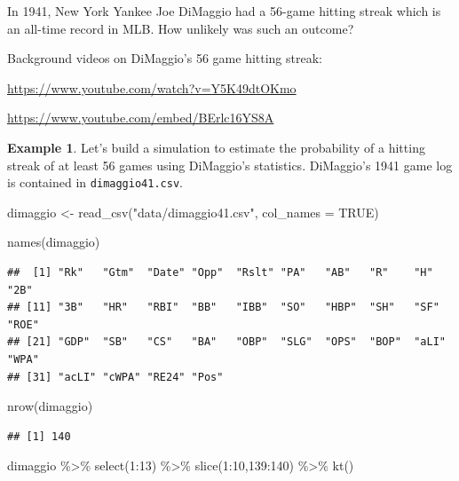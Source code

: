 \documentclass[
  11pt,
]{book}
\newenvironment{Shaded}{\begin{snugshade}}{\end{snugshade}}
\newcommand{\AttributeTok}[1]{\textcolor[rgb]{0.77,0.63,0.00}{#1}}
\newcommand{\ConstantTok}[1]{\textcolor[rgb]{0.00,0.00,0.00}{#1}}
\newcommand{\DecValTok}[1]{\textcolor[rgb]{0.00,0.00,0.81}{#1}}
\newcommand{\FunctionTok}[1]{\textcolor[rgb]{0.00,0.00,0.00}{#1}}
\newcommand{\NormalTok}[1]{#1}
\newcommand{\OtherTok}[1]{\textcolor[rgb]{0.56,0.35,0.01}{#1}}
\newcommand{\SpecialCharTok}[1]{\textcolor[rgb]{0.00,0.00,0.00}{#1}}
\newcommand{\StringTok}[1]{\textcolor[rgb]{0.31,0.60,0.02}{#1}}
\theoremstyle{definition}
\theoremstyle{definition}
\newtheorem{example}{Example}[chapter]
\theoremstyle{definition}
\theoremstyle{definition}
\theoremstyle{remark}
\begin{document}
In 1941, New York Yankee Joe DiMaggio had a 56-game hitting streak which is an all-time record in MLB. How unlikely was such an outcome?

Background videos on DiMaggio's 56 game hitting streak:

\url{https://www.youtube.com/watch?v=Y5K49dtOKmo}

\url{https://www.youtube.com/embed/BErlc16YS8A}

\begin{example}
Let's build a simulation to estimate the probability of a hitting streak of at least 56 games using DiMaggio's statistics. DiMaggio's 1941 game log is contained in \texttt{dimaggio41.csv}.
\end{example}

\begin{Shaded}
\begin{Highlighting}[]
\NormalTok{dimaggio }\OtherTok{\textless{}{-}} \FunctionTok{read\_csv}\NormalTok{(}\StringTok{"data/dimaggio41.csv"}\NormalTok{, }\AttributeTok{col\_names =} \ConstantTok{TRUE}\NormalTok{)}

\FunctionTok{names}\NormalTok{(dimaggio)}
\end{Highlighting}
\end{Shaded}

\begin{verbatim}
##  [1] "Rk"   "Gtm"  "Date" "Opp"  "Rslt" "PA"   "AB"   "R"    "H"    "2B"  
## [11] "3B"   "HR"   "RBI"  "BB"   "IBB"  "SO"   "HBP"  "SH"   "SF"   "ROE" 
## [21] "GDP"  "SB"   "CS"   "BA"   "OBP"  "SLG"  "OPS"  "BOP"  "aLI"  "WPA" 
## [31] "acLI" "cWPA" "RE24" "Pos"
\end{verbatim}

\begin{Shaded}
\begin{Highlighting}[]
\FunctionTok{nrow}\NormalTok{(dimaggio)}
\end{Highlighting}
\end{Shaded}

\begin{verbatim}
## [1] 140
\end{verbatim}

\begin{Shaded}
\begin{Highlighting}[]
\NormalTok{dimaggio }\SpecialCharTok{\%\textgreater{}\%} \FunctionTok{select}\NormalTok{(}\DecValTok{1}\SpecialCharTok{:}\DecValTok{13}\NormalTok{) }\SpecialCharTok{\%\textgreater{}\%} \FunctionTok{slice}\NormalTok{(}\DecValTok{1}\SpecialCharTok{:}\DecValTok{10}\NormalTok{,}\DecValTok{139}\SpecialCharTok{:}\DecValTok{140}\NormalTok{) }\SpecialCharTok{\%\textgreater{}\%} \FunctionTok{kt}\NormalTok{()}
\end{Highlighting}
\end{Shaded}
\end{document}
